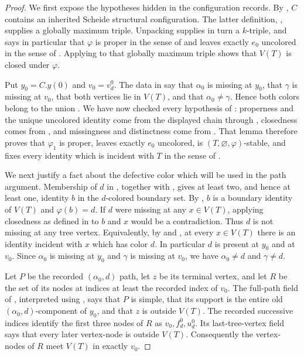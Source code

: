 \begin{proof}
We first expose the hypotheses hidden in the configuration records.  By
, $C$ contains an inherited
Scheide structural configuration.  The latter definition,
, supplies a globally maximum
triple.  Unpacking  supplies in turn a
$k$-triple, and  says in particular that $\varphi$ is
proper in the sense of  and leaves exactly
$e_0$ uncolored in the sense of .  Applying
 to that globally maximum triple shows
that $V(T)$ is closed under $\varphi$.

Put $y_0=C.y(0)$ and $v_0=v^0_d$.  The data in
 say that $\alpha_0$ is missing at $y_0$,
that $\gamma$ is missing at $v_0$, that both vertices lie in $V(T)$, and
that $\alpha_0\ne\gamma$.  Hence both colors belong to the union
.  We have now checked every hypothesis of
: properness and the unique uncolored
identity come from the displayed chain through ,
closedness comes from , and missingness
and distinctness come from .  That lemma
therefore proves that $\varphi_1$ is proper, leaves exactly $e_0$
uncolored, is $(T,\varnothing,\varphi)$-stable, and fixes every identity
which is incident with $T$ in the sense of .

We next justify a fact about the defective color which will be used in the
path argument.  Membership of $d$ in , together
with , gives at least two, and hence at least one,
identity $b$ in the $d$-colored boundary set.  By
, $b$ is a boundary identity of $V(T)$ and
$\varphi(b)=d$.  If $d$ were missing at any $x\in V(T)$, applying
closedness as defined in  to $b$ and $x$
would be a contradiction.  Thus $d$ is not missing at any tree vertex.
Equivalently, by  and , at
every $x\in V(T)$ there is an identity incident with $x$ which has color
$d$.  In particular $d$ is present at $y_0$ and at $v_0$.  Since
$\alpha_0$ is missing at $y_0$ and $\gamma$ is missing at $v_0$, we have
$\alpha_0\ne d$ and $\gamma\ne d$.

Let $P$ be the recorded $(\alpha_0,d)$ path, let $z$ be its terminal
vertex, and let $R$ be the set of its nodes at indices at least the
recorded index of $v_0$.  The full-path field of
, interpreted using
, says that $P$ is simple, that its
support is the entire old $(\alpha_0,d)$-component of $y_0$, and that $z$
is outside $V(T)$.  The recorded successive indices identify the first
three nodes of $R$ as $v_0,f^0_d,u^0_d$.  Its last-tree-vertex field says
that every later vertex-node is outside $V(T)$.  Consequently the
vertex-nodes of $R$ meet $V(T)$ in exactly $v_0$.


\end{proof}
